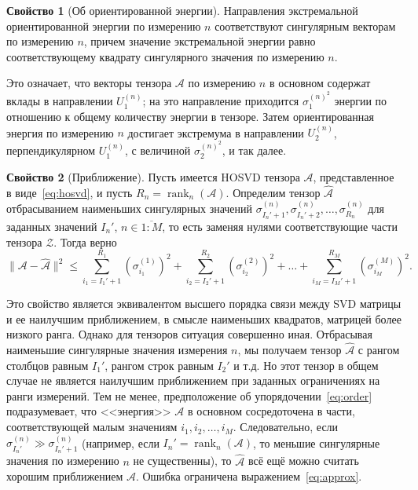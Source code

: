 \documentclass[specialist,
    substylefile = spbu_report.rtx,
    subf,href,colorlinks=true, 12pt]{disser}
\theoremstyle{plain}
\theoremstyle{definition}
\newtheorem{property}{Свойство}[section]
\theoremstyle{remark}
\begin{document}
    \begin{property}[Об ориентированной энергии]
        \label{property:oriented-energy}
        Направления экстремальной ориентированной энергии по измерению $n$ соответствуют сингулярным векторам по измерению $n$,
        причем значение экстремальной энергии равно соответствующему квадрату сингулярного значения по измерению $n$.
    \end{property}

    Это означает, что векторы тензора $\mathcal{A}$ по измерению $n$ в основном содержат вклады в направлении $U^{(n)}_1$;
    на это направление приходится $\sigma^{(n)^2}_1$ энергии по отношению к общему количеству энергии в тензоре.
    Затем ориентированная энергия по измерению $n$ достигает экстремума в направлении $U^{(n)}_2$,
    перпендикулярном $U^{(n)}_1$, с величиной $\sigma^{(n)^2}_2$, и так далее.

    \begin{property}[Приближение]
        \label{property:approx}
        Пусть имеется HOSVD тензора $\mathcal{A}$, представленное в виде~\eqref{eq:hosvd}, и пусть $R_n=\operatorname{rank}_n(\mathcal{A})$.
        Определим тензор $\hat{\mathcal{A}}$ отбрасыванием наименьших сингулярных значений $\sigma_{I_{n}'+1}^{(n)}, \sigma_{I_{n}'+2}^{(n)},\ldots, \sigma_{R_n}^{(n)}$
        для заданных значений $I_{n}'$, $n \in \overline{1:M}$, то есть заменяя нулями соответствующие части тензора $\mathcal{Z}$.
        Тогда верно
        \begin{equation}
            \|\mathcal{A}-\hat{\mathcal{A}}\|^2\leqslant \sum_{i_1=I_{1}'+1}^{R_1}\left( \sigma_{i_1}^{(1)}\right)^2 +
            \sum_{i_2=I_{2}'+1}^{R_2}\left( \sigma_{i_2}^{(2)}\right)^2 + \ldots + \sum_{i_M=I_{M}'+1}^{R_M}\left( \sigma_{i_M}^{(M)}\right)^2.\label{eq:approx}
        \end{equation}
    \end{property}

    Это свойство является эквивалентом высшего порядка связи между SVD матрицы и ее наилучшим приближением,
    в смысле наименьших квадратов, матрицей более низкого ранга.
    Однако для тензоров ситуация совершенно иная.
    Отбрасывая наименьшие сингулярные значения измерения $n$, мы получаем тензор $\hat{\mathcal{A}}$ с рангом столбцов
    равным $I_1'$, рангом строк равным $I_2'$ и т.д.
    Но этот тензор в общем случае не является наилучшим приближением при заданных ограничениях на ранги измерений.
    Тем не менее, предположение об упорядочении~\eqref{eq:order} подразумевает, что <<энергия>> $\mathcal{A}$ в основном сосредоточена в части,
    соответствующей малым значениям $i_1, i_2, \ldots, i_M$.
    Следовательно, если $\sigma^{(n)}_{I_n'} \gg \sigma^{(n)}_{I_n'+1}$ (например, если $I_n'=\operatorname{rank}_n(\mathcal{A})$,
    то меньшие сингулярные значения по измерению $n$ не существенны), то $\hat{\mathcal{A}}$ всё ещё можно считать хорошим приближением $\mathcal{A}$.
    Ошибка ограничена выражением~\eqref{eq:approx}.
\end{document}
